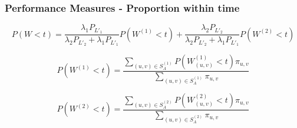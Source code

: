 \begin{frame}
    \frametitle{Performance Measures - Proportion within time}
    \centering
    
    \small
    \begin{equation*}
        P(W < t) = \frac{\lambda_1 P_{L'_1}}{\lambda_2 P_{L'_2}+\lambda_1 P_{L'_1}} 
        P(W^{(1)} < t) + \frac{\lambda_2 P_{L'_2}}{\lambda_2 P_{L'_2} + 
        \lambda_1 P_{L'_1}}P(W^{(2)} < t) 
    \end{equation*}

    \begin{equation*}
        P(W^{(1)} < t) = \frac{\sum_{(u,v) \in S_A^{(1)}} P(W_{(u,v)}^{(1)} < t) 
        \pi_{u,v} }{\sum_{(u,v) \in S_A^{(1)}} \pi_{u,v}}
    \end{equation*}
    
    
    \begin{equation*}
        P(W^{(2)} < t) = \frac{\sum_{(u,v) \in S_A^{(2)}} P(W_{(u,v)}^{(2)} < t) 
        \pi_{u,v} }{\sum_{(u,v) \in S_A^{(2)}} \pi_{u,v}}
    \end{equation*}
    
\end{frame}


